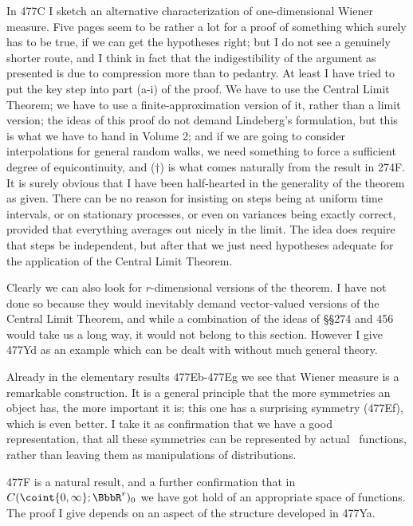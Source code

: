 {In 477C I sketch an alternative characterization of one-dimensional Wiener
measure.   Five pages seem to be rather a lot for a proof of
something which surely has to be true, if we can get the hypotheses right;
but I do not see a genuinely
shorter route, and I think in fact that the indigestibility of the argument
as presented is due to compression more than to pedantry.
At least I have tried to put the key step into part (a-i) of the proof.
We have to use the Central Limit Theorem;  we have to use a
finite-approximation version of it, rather than a limit version;  the ideas
of this proof do not demand Lindeberg's formulation, but this is what we
have to hand in Volume 2;  and if we are going to consider interpolations
for general random walks, we need something to force a sufficient degree
of equicontinuity, and ($\dagger$) is what comes naturally from the result
in 274F.   It is surely obvious that I have been half-hearted in the
generality of the theorem as given.   There can be no reason for insisting
on steps being at uniform time intervals, or on stationary processes, or
even on variances being exactly correct, provided that everything averages
out nicely in the limit.   The idea does require that steps be
independent, but after that we just need hypotheses adequate for the
application of the Central Limit Theorem.

Clearly we can also look for $r$-dimensional versions of the theorem.   I
have not done so because they would inevitably demand vector-valued
versions of the Central Limit Theorem, and while a combination of
the ideas of
\S\S274 and 456 would take us a long way, it would not belong to this
section.   However I give 477Yd as an example which can be dealt with
without much general theory.

Already in the elementary results
477Eb-477Eg %
we see that Wiener measure is a remarkable construction.
It is a general principle that the more symmetries an object has, the more
important it is;  this one has a surprising symmetry (477Ef), which is even
better.   I take it as confirmation that we have a good representation,
that all these symmetries can be represented by actual \imp\ functions,
rather than leaving them as manipulations of distributions.

477F is a natural result, and a further confirmation that in
$C(\coint{0,\infty};\BbbR^r)_0$ we have got hold
of an appropriate space of functions.   The proof I give depends on an
aspect of the structure developed in 477Ya.

}

